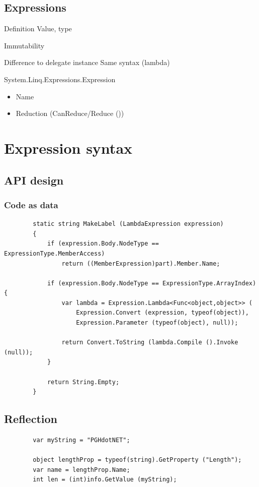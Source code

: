 \documentclass{beamer}
\begin{document}
\subsection{Expressions}
	\begin{frame}
		Definition
		Value, type
	\end{frame}
	\begin{frame}
		Immutability
	\end{frame}
	\begin{frame}
		Difference to delegate instance
		Same syntax (lambda)
	\end{frame}
	\begin{frame}
		System.Linq.Expressions.Expression
		\begin{itemize}
			\item Name
			\item Reduction (CanReduce/Reduce ())
		\end{itemize}
	\end{frame}

\section{Expression syntax}
\subsection{API design}
	\begin{frame}
	\end{frame}
	\begin{frame}[fragile]
		\frametitle{Code as data}
		\begin{verbatim}
		static string MakeLabel (LambdaExpression expression)
		{
		    if (expression.Body.NodeType == ExpressionType.MemberAccess)
		        return ((MemberExpression)part).Member.Name;

		    if (expression.Body.NodeType == ExpressionType.ArrayIndex) {
		        var lambda = Expression.Lambda<Func<object,object>> (
		            Expression.Convert (expression, typeof(object)),
		            Expression.Parameter (typeof(object), null));

		        return Convert.ToString (lambda.Compile ().Invoke (null));
		    }

		    return String.Empty;
		}
		\end{verbatim}
	\end{frame}

\subsection{Reflection}
	\begin{frame}[fragile]
		\begin{verbatim}
		var myString = "PGHdotNET";

		object lengthProp = typeof(string).GetProperty ("Length");
		var name = lengthProp.Name;
		int len = (int)info.GetValue (myString);
		\end{verbatim}
	\end{frame}
\end{document}
